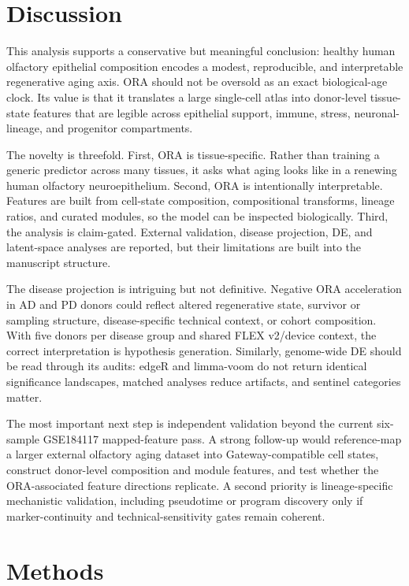 \documentclass[11pt]{article}
\begin{document}
\section{Discussion}

This analysis supports a conservative but meaningful conclusion: healthy human olfactory epithelial composition encodes a modest, reproducible, and interpretable regenerative aging axis. ORA should not be oversold as an exact biological-age clock. Its value is that it translates a large single-cell atlas into donor-level tissue-state features that are legible across epithelial support, immune, stress, neuronal-lineage, and progenitor compartments.

The novelty is threefold. First, ORA is tissue-specific. Rather than training a generic predictor across many tissues, it asks what aging looks like in a renewing human olfactory neuroepithelium. Second, ORA is intentionally interpretable. Features are built from cell-state composition, compositional transforms, lineage ratios, and curated modules, so the model can be inspected biologically. Third, the analysis is claim-gated. External validation, disease projection, DE, and latent-space analyses are reported, but their limitations are built into the manuscript structure.

The disease projection is intriguing but not definitive. Negative ORA acceleration in AD and PD donors could reflect altered regenerative state, survivor or sampling structure, disease-specific technical context, or cohort composition. With five donors per disease group and shared FLEX v2/device context, the correct interpretation is hypothesis generation. Similarly, genome-wide DE should be read through its audits: edgeR and limma-voom do not return identical significance landscapes, matched analyses reduce artifacts, and sentinel categories matter.

The most important next step is independent validation beyond the current six-sample GSE184117 mapped-feature pass. A strong follow-up would reference-map a larger external olfactory aging dataset into Gateway-compatible cell states, construct donor-level composition and module features, and test whether the ORA-associated feature directions replicate. A second priority is lineage-specific mechanistic validation, including pseudotime or program discovery only if marker-continuity and technical-sensitivity gates remain coherent.

\section{Methods}
\end{document}
